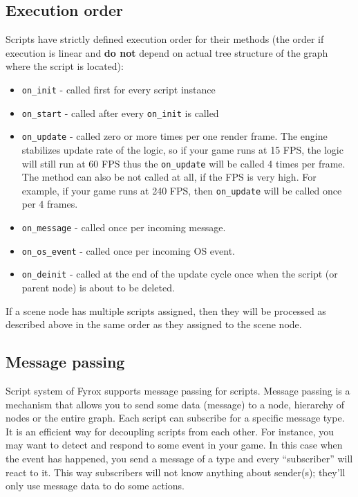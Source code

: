 \documentclass[
]{book}
\providecommand{\tightlist}{%
  \setlength{\itemsep}{0pt}\setlength{\parskip}{0pt}}
\theoremstyle{definition}
\theoremstyle{definition}
\theoremstyle{definition}
\theoremstyle{definition}
\theoremstyle{remark}
\begin{document}
\subsection{Execution order}\label{execution-order}

Scripts have strictly defined execution order for their methods (the order if execution is linear and \textbf{do not} depend on actual tree structure of the graph where the script is located):

\begin{itemize}
\tightlist
\item
  \texttt{on\_init} - called first for every script instance
\item
  \texttt{on\_start} - called after every \texttt{on\_init} is called
\item
  \texttt{on\_update} - called zero or more times per one render frame. The engine stabilizes update rate of the logic, so if your game runs at 15 FPS, the logic will still run at 60 FPS thus the \texttt{on\_update} will be called 4 times per frame. The method can also be not called at all, if the FPS is very high. For example, if your game runs at 240 FPS, then \texttt{on\_update} will be called once per 4 frames.
\item
  \texttt{on\_message} - called once per incoming message.
\item
  \texttt{on\_os\_event} - called once per incoming OS event.
\item
  \texttt{on\_deinit} - called at the end of the update cycle once when the script (or parent node) is about to be deleted.
\end{itemize}

If a scene node has multiple scripts assigned, then they will be processed as described above in the same order as they assigned to the scene node.

\subsection{Message passing}\label{message-passing-1}

Script system of Fyrox supports message passing for scripts. Message passing is a mechanism that allows you to send some data (message) to a node, hierarchy of nodes or the entire graph. Each script can subscribe for a specific message type. It is an efficient way for decoupling scripts from each other. For instance, you may want to detect and respond to some event in your game. In this case when the event has happened, you send a message of a type and every ``subscriber'' will react to it. This way subscribers will not know anything about sender(s); they'll only use message data to do some actions.
\end{document}
